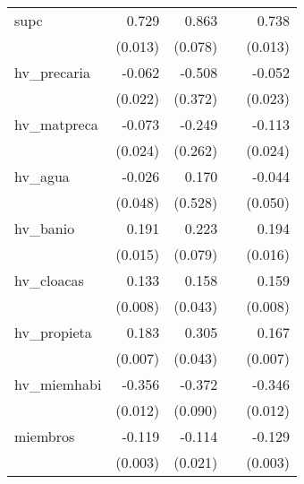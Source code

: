 {\begin{longtable}{l*{4}{D{.}{.}{-1}}}
\addlinespace
supc        &       0.729\sym{***}&       0.863\sym{***}&                     &       0.738\sym{***}\\
            &     (0.013)         &     (0.078)         &                     &     (0.013)         \\
\addlinespace
hv\_precaria &      -0.062\sym{**} &      -0.508         &                     &      -0.052\sym{*}  \\
            &     (0.022)         &     (0.372)         &                     &     (0.023)         \\
\addlinespace
hv\_matpreca &      -0.073\sym{**} &      -0.249         &                     &      -0.113\sym{***}\\
            &     (0.024)         &     (0.262)         &                     &     (0.024)         \\
\addlinespace
hv\_agua     &      -0.026         &       0.170         &                     &      -0.044         \\
            &     (0.048)         &     (0.528)         &                     &     (0.050)         \\
\addlinespace
hv\_banio    &       0.191\sym{***}&       0.223\sym{**} &                     &       0.194\sym{***}\\
            &     (0.015)         &     (0.079)         &                     &     (0.016)         \\
\addlinespace
hv\_cloacas  &       0.133\sym{***}&       0.158\sym{***}&                     &       0.159\sym{***}\\
            &     (0.008)         &     (0.043)         &                     &     (0.008)         \\
\addlinespace
hv\_propieta &       0.183\sym{***}&       0.305\sym{***}&                     &       0.167\sym{***}\\
            &     (0.007)         &     (0.043)         &                     &     (0.007)         \\
\addlinespace
hv\_miemhabi &      -0.356\sym{***}&      -0.372\sym{***}&                     &      -0.346\sym{***}\\
            &     (0.012)         &     (0.090)         &                     &     (0.012)         \\
\addlinespace
miembros    &      -0.119\sym{***}&      -0.114\sym{***}&                     &      -0.129\sym{***}\\
            &     (0.003)         &     (0.021)         &                     &     (0.003)         \\

\end{longtable}}
